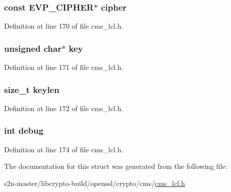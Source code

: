 \subsubsection[{\texorpdfstring{cipher}{cipher}}]{\setlength{\rightskip}{0pt plus 5cm}const {\bf E\+V\+P\+\_\+\+C\+I\+P\+H\+ER}$\ast$ cipher}\hypertarget{struct_c_m_s___encrypted_content_info__st_a2a3fabda50b1a54bfb0ab0946771cc11}{}\label{struct_c_m_s___encrypted_content_info__st_a2a3fabda50b1a54bfb0ab0946771cc11}


Definition at line 170 of file cms\+\_\+lcl.\+h.

\subsubsection[{\texorpdfstring{key}{key}}]{\setlength{\rightskip}{0pt plus 5cm}unsigned char$\ast$ key}\hypertarget{struct_c_m_s___encrypted_content_info__st_a1cb5ee363f3d6d0f548eb6e64d72a7c8}{}\label{struct_c_m_s___encrypted_content_info__st_a1cb5ee363f3d6d0f548eb6e64d72a7c8}


Definition at line 171 of file cms\+\_\+lcl.\+h.

\subsubsection[{\texorpdfstring{keylen}{keylen}}]{\setlength{\rightskip}{0pt plus 5cm}size\+\_\+t keylen}\hypertarget{struct_c_m_s___encrypted_content_info__st_af347fae5dae0b613448c54f3dea76ad2}{}\label{struct_c_m_s___encrypted_content_info__st_af347fae5dae0b613448c54f3dea76ad2}


Definition at line 172 of file cms\+\_\+lcl.\+h.

\subsubsection[{\texorpdfstring{debug}{debug}}]{\setlength{\rightskip}{0pt plus 5cm}int debug}\hypertarget{struct_c_m_s___encrypted_content_info__st_ac3e1795766a80ec63b157951b4b9a7d4}{}\label{struct_c_m_s___encrypted_content_info__st_ac3e1795766a80ec63b157951b4b9a7d4}


Definition at line 174 of file cms\+\_\+lcl.\+h.



The documentation for this struct was generated from the following file\+:\begin{DoxyCompactItemize}
\item 
s2n-\/master/libcrypto-\/build/openssl/crypto/cms/\hyperlink{cms__lcl_8h}{cms\+\_\+lcl.\+h}\end{DoxyCompactItemize}
